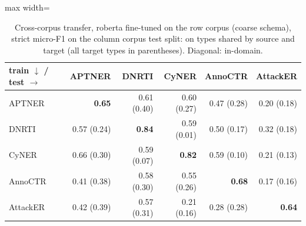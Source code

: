 \begin{table}[t]
\centering
\caption{Cross-corpus transfer, roberta fine-tuned on the row corpus (coarse schema), strict micro-F1 on the column corpus test split: on types shared by source and target (all target types in parentheses). Diagonal: in-domain.}
\label{tab:transfer_roberta}
\small
\begin{adjustbox}{max width=\textwidth}
\begin{tabular}{lrrrrr}
\toprule
train $\downarrow$ / test $\rightarrow$ & APTNER & DNRTI & CyNER & AnnoCTR & AttackER \\
\midrule
APTNER & \textbf{0.65} & 0.61 (0.40) & 0.60 (0.27) & 0.47 (0.28) & 0.20 (0.18) \\
DNRTI & 0.57 (0.24) & \textbf{0.84} & 0.59 (0.01) & 0.50 (0.17) & 0.32 (0.18) \\
CyNER & 0.66 (0.30) & 0.59 (0.07) & \textbf{0.82} & 0.59 (0.10) & 0.21 (0.13) \\
AnnoCTR & 0.41 (0.38) & 0.58 (0.30) & 0.55 (0.26) & \textbf{0.68} & 0.17 (0.16) \\
AttackER & 0.42 (0.39) & 0.57 (0.31) & 0.21 (0.16) & 0.28 (0.28) & \textbf{0.64} \\
\bottomrule
\end{tabular}
\end{adjustbox}
\end{table}